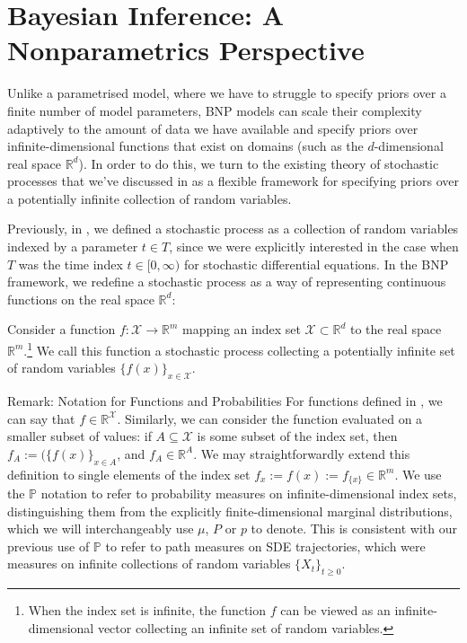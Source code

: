 \section{Bayesian Inference: A Nonparametrics Perspective}

Unlike a parametrised model, where we have to struggle to specify priors over a finite number of model parameters, BNP models can scale their complexity adaptively to the amount of data we have available and specify priors over infinite-dimensional functions that exist on domains (such as the $d$-dimensional real space $\mathbb{R}^d$). In order to do this, we turn to the existing theory of stochastic processes that we've discussed in  as a flexible framework for specifying priors over a potentially infinite collection of random variables.

Previously, in , we defined a stochastic process as a collection of random variables indexed by a parameter $t \in T$, since we were explicitly interested in the case when $T$ was the time index $t \in [0, \infty)$ for stochastic differential equations. In the BNP framework, we redefine a stochastic process as a way of representing continuous functions on the real space $\mathbb{R}^d$:
\label{ntn:index_set}\label{ntn:function}

\begin{definition}
    \label{def:stochastic_process_function_space}
    Consider a function $f : \mathcal{X} \rightarrow \mathbb{R}^m$ mapping an index set $\mathcal{X} \subset \mathbb{R}^d$ to the real space $\mathbb{R}^m$.\footnote{When the index set is infinite, the function $f$ can be viewed as an infinite-dimensional vector collecting an infinite set of random variables.} We call this function a stochastic process collecting a potentially infinite set of random variables $\{f(x)\}_{x \in \mathcal{X}}$.
\end{definition}

\begin{lightgraybox}{Remark: Notation for Functions and Probabilities}
    For functions defined in , we can say that $f \in \mathbb{R}^{\mathcal{X}}$. Similarly, we can consider the function evaluated on a smaller subset of values: if $A \subseteq \mathcal{X}$ is some subset of the index set, then $f_A:=(\{f(x)\}_{x \in A}$, and $f_A \in \mathbb{R}^A$. We may straightforwardly extend this definition to single elements of the index set $f_x:= f(x) := f_{\{x\}} \in \mathbb{R}^m$. We use the $\mathbb{P}$ notation to refer to probability measures on infinite-dimensional index sets, distinguishing them from the explicitly finite-dimensional marginal distributions, which we will interchangeably use $\mu$, $P$ or $p$ to denote. This is consistent with our previous use of $\mathbb{P}$ to refer to path measures on SDE trajectories, which were measures on infinite collections of random variables $\{X_t\}_{t \geq 0}$.
\end{lightgraybox}

